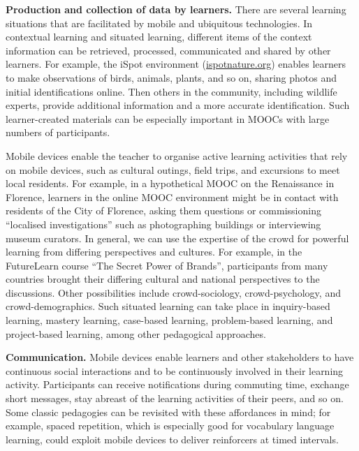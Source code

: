\textbf{Production and collection of
data by learners.}  There are several learning situations that are
facilitated by mobile and ubiquitous technologies. In contextual
learning and situated learning, different items of the context
information can be retrieved, processed, communicated and shared by
other learners. For example, the iSpot environment
(\url{ispotnature.org}) enables learners to make observations of
birds, animals, plants, and so on, sharing photos and initial
identifications online. Then others in the community, including
wildlife experts, provide additional information and a more accurate
identification. Such learner-created materials can be
especially important in MOOCs with large numbers of participants. 

Mobile devices enable the teacher to organise active
learning activities that rely on mobile devices, such as
cultural outings, field trips, and excursions to meet local residents.
For example, in a hypothetical MOOC on the
Renaissance in Florence, learners in the online MOOC environment might be
in contact with residents of the City of Florence, asking them questions
or commissioning ``localised investigations'' such as
photographing buildings or interviewing museum curators. In general, we
can use the expertise of the crowd for powerful learning from differing
perspectives and cultures. For example, in the FutureLearn course ``The
Secret Power 
of Brands'', participants from many countries
brought their differing cultural and national
perspectives to the discussions. Other possibilities include
crowd-sociology, crowd-psychology, and crowd-demographics. 
Such situated learning can take place in inquiry-based learning, mastery
learning, case-based learning, problem-based learning, and project-based
learning, among other pedagogical approaches.

\textbf{Communication.} Mobile devices enable learners and other
stakeholders to have continuous social interactions and to be
continuously involved in their learning activity.
Participants can receive notifications during commuting time, exchange
short messages, stay abreast of the learning activities of their peers,
and so on.
Some classic pedagogies can be revisited with these affordances in
mind; for example, spaced repetition, which is especially good for
vocabulary language learning, could exploit mobile devices to deliver
reinforcers at timed intervals.

